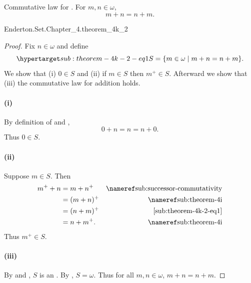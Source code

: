 \documentclass{report}
\begin{document}
\subsection{}%

  \begin{theorem}[4K-2]
    Commutative law for .
    For $m, n \in \omega$, $$m + n = n + m.$$
  \end{theorem}

    {Enderton.Set.Chapter\_4.theorem\_4k\_2}


  \begin{proof}

    Fix $n \in \omega$ and define
      \begin{equation}
        \hyperlabel{sub:theorem-4k-2-eq1}
        S = \{m \in \omega \mid m + n = n + m\}.
      \end{equation}
    We show that (i) $0 \in S$ and (ii) if $m \in S$ then $m^+ \in S$.
    Afterward we show that (iii) the commutative law for addition holds.

    \paragraph{(i)}%

      By definition of  and
        , $$0 + n = n = n + 0.$$
      Thus $0 \in S$.

    \paragraph{(ii)}%

      Suppose $m \in S$.
      Then
        \begin{align*}
          m^+ + n
            & = m + n^+ & \textref{sub:successor-commutativity} \\
            & = (m + n)^+ & \textref{sub:theorem-4i} \\
            & = (n + m)^+ & \eqref{sub:theorem-4k-2-eq1} \\
            & = n + m^+. & \textref{sub:theorem-4i}
        \end{align*}
      Thus $m^+ \in S$.

    \paragraph{(iii)}%

      By  and , $S$
        is an .
      By , $S = \omega$.
      Thus for all $m, n \in \omega$, $m + n = n + m$.

  \end{proof}
\end{document}
